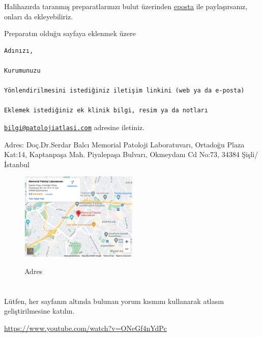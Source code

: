 \documentclass[
  letterpaper,
  DIV=11,
  numbers=noendperiod]{scrreprt}
\begin{document}
Halihazırda taranmış preparatlarınızı bulut üzerinden
\href{mailto:bilgi@patolojiatlasi.com}{eposta} ile paylaşırsanız, onları
da ekleyebiliriz.

Preparatın olduğu sayfaya eklenmek üzere

\begin{verbatim}
Adınızı,

Kurumunuzu

Yönlendirilmesini istediğiniz iletişim linkini (web ya da e-posta)

Eklemek istediğiniz ek klinik bilgi, resim ya da notları
\end{verbatim}

\href{mailto:bilgi@patolojiatlasi.com}{\nolinkurl{bilgi@patolojiatlasi.com}}
adresine iletiniz.

Adres: Doç.Dr.Serdar Balcı Memorial Patoloji Laboratuvarı, Ortadoğu
Plaza Kat:14, Kaptanpaşa Mah. Piyalepaşa Bulvarı, Okmeydanı Cd No:73,
34384 Şişli/İstanbul

\begin{figure}

{\centering 

\href{https://www.google.com/maps/embed?pb=!1m14!1m8!1m3!1d12033.28963318435!2d28.9735333!3d41.0619447!3m2!1i1024!2i768!4f13.1!3m3!1m2!1s0x0\%3A0x5b15447cefe51a4e!2sMemorial\%20Patoloji\%20Laboratuvar\%C4\%B1!5e0!3m2!1sen!2str!4v1646745650518!5m2!1sen!2str}{\includegraphics[width=0.5\textwidth,height=\textheight]{./screenshots/thumbnail_katki.png}}

}

\caption{Adres}

\end{figure}

\hypertarget{section-20}{%
\chapter{}\label{section-20}}

Lütfen, her sayfanın altında bulunan yorum kısmını kullanarak atlasın
geliştirilmesine katılın.

\url{https://www.youtube.com/watch?v=ONeGf4nYdPc}



\printindex
\end{document}

